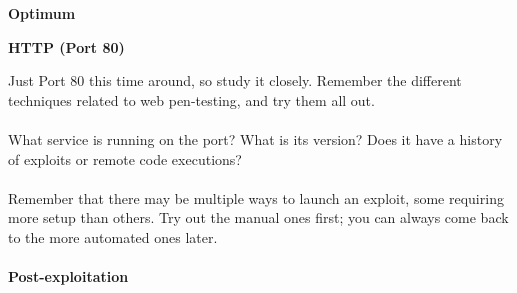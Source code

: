 \documentclass[a4paper,11pt]{article}
\begin{document}
\begin{center}
{\bfseries Optimum}
\end{center}

{\bfseries HTTP (Port 80)}

Just Port 80 this time around, so study it closely. Remember the different techniques related to web pen-testing, and try them all out.
\\
\\
What service is running on the port? What is its version? Does it have a history of exploits or remote code executions?
\\
\\
Remember that there may be multiple ways to launch an exploit, some requiring more setup than others. Try out the manual ones first; you can always come back to the more automated ones later.
\\
\\
{\bfseries Post-exploitation}
\end{document}
